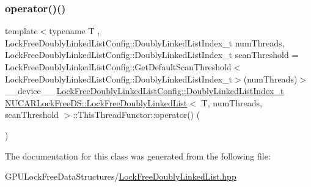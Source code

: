 \subsubsection{\texorpdfstring{operator()()}{operator()()}}
{\footnotesize\ttfamily template$<$typename T , Lock\+Free\+Doubly\+Linked\+List\+Config\+::\+Doubly\+Linked\+List\+Index\+\_\+t num\+Threads, Lock\+Free\+Doubly\+Linked\+List\+Config\+::\+Doubly\+Linked\+List\+Index\+\_\+t scan\+Threshold = Lock\+Free\+Doubly\+Linked\+List\+Config\+::\+Get\+Default\+Scan\+Threshold$<$\+Lock\+Free\+Doubly\+Linked\+List\+Config\+::\+Doubly\+Linked\+List\+Index\+\_\+t$>$(num\+Threads)$>$ \\
\+\_\+\+\_\+device\+\_\+\+\_\+ \mbox{\hyperlink{namespace_n_u_c_a_r_lock_free_d_s_1_1_lock_free_doubly_linked_list_config_ad084f1e0e5259e450dbbbd2f7cfdb979}{Lock\+Free\+Doubly\+Linked\+List\+Config\+::\+Doubly\+Linked\+List\+Index\+\_\+t}} \mbox{\hyperlink{class_n_u_c_a_r_lock_free_d_s_1_1_lock_free_doubly_linked_list}{N\+U\+C\+A\+R\+Lock\+Free\+D\+S\+::\+Lock\+Free\+Doubly\+Linked\+List}}$<$ T, num\+Threads, scan\+Threshold $>$\+::This\+Thread\+Functor\+::operator() (\begin{DoxyParamCaption}{ }\end{DoxyParamCaption})\hspace{0.3cm}{\ttfamily [inline]}}



The documentation for this class was generated from the following file\+:\begin{DoxyCompactItemize}
\item 
G\+P\+U\+Lock\+Free\+Data\+Structures/\mbox{\hyperlink{_lock_free_doubly_linked_list_8hpp}{Lock\+Free\+Doubly\+Linked\+List.\+hpp}}\end{DoxyCompactItemize}
